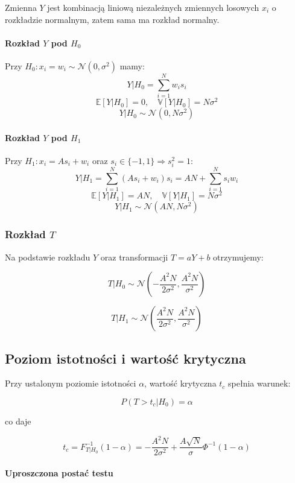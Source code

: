 \documentclass[12pt,a4paper]{article}
\begin{document}
Zmienna $Y$ jest kombinacją liniową niezależnych zmiennych losowych $x_i$ o rozkładzie normalnym, zatem sama ma rozkład normalny.

\paragraph{Rozkład $Y$ pod $H_0$}

Przy $H_0: x_i = w_i \sim \mathcal{N}(0, \sigma^2)$ mamy:
$$Y | H_0 = \sum_{i=1}^N w_i s_i$$
$$\mathbb{E}[Y | H_0] = 0, \quad \mathbb{V}[Y | H_0] = N \sigma^2$$
$$Y | H_0 \sim \mathcal{N}(0, N\sigma^2)$$

\paragraph{Rozkład $Y$ pod $H_1$}

Przy $H_1: x_i = As_i + w_i$ oraz $s_i \in \{-1, 1\} \Rightarrow s_i^2=1$:
$$Y | H_1 = \sum_{i=1}^N (As_i + w_i)s_i = AN + \sum_{i=1}^N s_i w_i$$
$$\mathbb{E}[Y | H_1] = AN, \quad \mathbb{V}[Y | H_1] = N \sigma^2$$
$$Y | H_1 \sim \mathcal{N}(AN, N \sigma^2)$$

\subsubsection{Rozkład $T$}

Na podstawie rozkładu $Y$ oraz transformacji $T = aY + b$ otrzymujemy:

$$T | H_0 \sim \mathcal{N} \left( -\frac{A^2N}{2 \sigma^2}, \frac{A^2N}{\sigma^2} \right)$$

$$T | H_1 \sim \mathcal{N} \left( \frac{A^2N}{2 \sigma^2}, \frac{A^2N}{\sigma^2} \right)$$

\subsection{Poziom istotności i wartość krytyczna}

Przy ustalonym poziomie istotności $\alpha$, wartość krytyczna $t_c$ spełnia warunek:

$$P(T > t_c | H_0) = \alpha$$

co daje

$$t_c = F^{-1}_{T|H_0}(1-\alpha) = -\frac{A^2N}{2\sigma^2} + \frac{A\sqrt{N}}{\sigma} \Phi^{-1}(1-\alpha)$$

\paragraph{Uproszczona postać testu}
\end{document}
